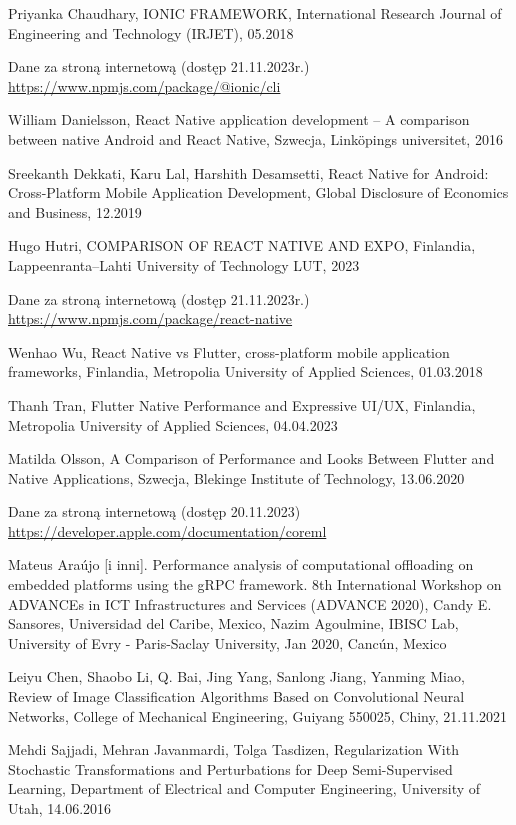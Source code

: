 \documentclass[12pt, a4paper, twoside, openany]{book}
\begin{document}
\begin{enumerate}[label={[}\arabic*{]}]
    \item Priyanka Chaudhary, IONIC FRAMEWORK, International Research Journal of Engineering and Technology (IRJET), 05.2018
    \item Dane za stroną internetową (dostęp 21.11.2023r.) \url{https://www.npmjs.com/package/@ionic/cli}
    \item William Danielsson, React Native application development – A comparison between native Android and React Native, Szwecja, Linköpings universitet, 2016
    \item Sreekanth Dekkati, Karu Lal, Harshith Desamsetti, React Native for Android: Cross-Platform Mobile Application Development, Global Disclosure of Economics and Business, 12.2019
    \item Hugo Hutri, COMPARISON OF REACT NATIVE AND EXPO, Finlandia, Lappeenranta–Lahti University of Technology LUT, 2023
    \item Dane za stroną internetową (dostęp 21.11.2023r.) \url{https://www.npmjs.com/package/react-native}
    \item Wenhao Wu, React Native vs Flutter, cross-platform mobile application frameworks, Finlandia, Metropolia University of Applied Sciences, 01.03.2018
    \item Thanh Tran, Flutter Native Performance and Expressive UI/UX, Finlandia, Metropolia University of Applied Sciences, 04.04.2023
    \item Matilda Olsson, A Comparison of Performance and Looks Between Flutter and Native Applications, Szwecja, Blekinge Institute of Technology, 13.06.2020
    \item Dane za stroną internetową (dostęp 20.11.2023) \url{https://developer.apple.com/documentation/coreml}
    \item Mateus Araújo [i inni]. Performance analysis of computational offloading on embedded platforms using the gRPC framework. 8th International Workshop on ADVANCEs in ICT Infrastructures and Services (ADVANCE 2020), Candy E. Sansores, Universidad del Caribe, Mexico, Nazim Agoulmine, IBISC Lab, University of Evry - Paris-Saclay University, Jan 2020, Cancún, Mexico
    \item Leiyu Chen, Shaobo Li, Q. Bai, Jing Yang, Sanlong Jiang, Yanming Miao, Review of Image Classification Algorithms Based on Convolutional Neural Networks, College of Mechanical Engineering, Guiyang 550025, Chiny, 21.11.2021
    \item Mehdi Sajjadi, Mehran Javanmardi, Tolga Tasdizen, Regularization With Stochastic Transformations and Perturbations for Deep Semi-Supervised Learning, Department of Electrical and Computer Engineering, University of Utah, 14.06.2016

\end{enumerate}
\end{document}
